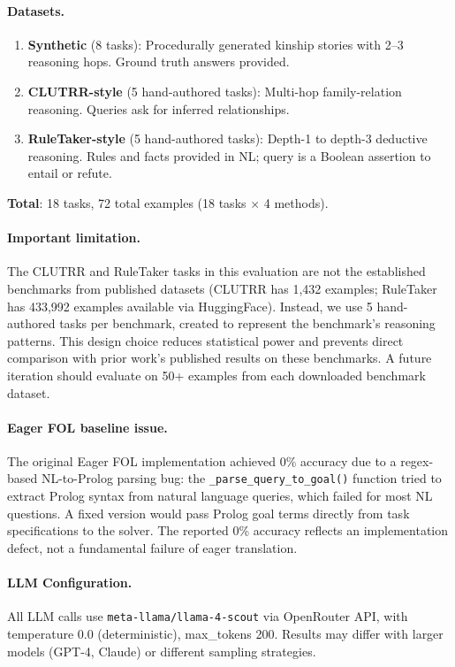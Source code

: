 \documentclass[11pt,letterpaper]{article}
\begin{document}
\paragraph{Datasets.}
\begin{enumerate}
  \item \textbf{Synthetic} (8 tasks): Procedurally generated kinship stories with 2--3
    reasoning hops. Ground truth answers provided.
  \item \textbf{CLUTRR-style} \citep{Sinha2019} (5 hand-authored tasks): Multi-hop
    family-relation reasoning. Queries ask for inferred relationships.
  \item \textbf{RuleTaker-style} \citep{Clark2020} (5 hand-authored tasks): Depth-1 to depth-3
    deductive reasoning. Rules and facts provided in NL; query is a Boolean assertion to entail
    or refute.
\end{enumerate}

\textbf{Total}: 18 tasks, 72 total examples (18 tasks $\times$ 4 methods).

\paragraph{Important limitation.} The CLUTRR and RuleTaker tasks in this evaluation are not
the established benchmarks from published datasets (CLUTRR has 1,432 examples; RuleTaker has
433,992 examples available via HuggingFace). Instead, we use 5 hand-authored tasks per
benchmark, created to represent the benchmark's reasoning patterns. This design choice reduces
statistical power and prevents direct comparison with prior work's published results on these
benchmarks. A future iteration should evaluate on 50+ examples from each downloaded benchmark
dataset.

\paragraph{Eager FOL baseline issue.} The original Eager FOL implementation achieved 0\%
accuracy due to a regex-based NL-to-Prolog parsing bug: the \texttt{\_parse\_query\_to\_goal()}
function tried to extract Prolog syntax from natural language queries, which failed for most NL
questions. A fixed version would pass Prolog goal terms directly from task specifications to
the solver. The reported 0\% accuracy reflects an implementation defect, not a fundamental
failure of eager translation.

\paragraph{LLM Configuration.} All LLM calls use \texttt{meta-llama/llama-4-scout} via
OpenRouter API, with temperature 0.0 (deterministic), max\_tokens 200. Results may differ
with larger models (GPT-4, Claude) or different sampling strategies.
\end{document}

